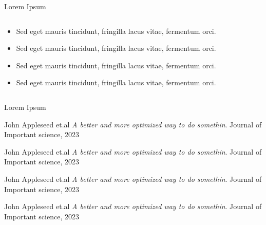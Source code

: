 \documentclass[UKenglish, aspectratio = 169]{beamer}
\begin{document}
\begin{frame}{Lorem Ipsum}
	\begin{columns}
		\begin{column}[T]{0.8\textwidth}
			\vspace*{4ex}
			\begin{itemize}
				\item Sed eget mauris tincidunt, fringilla lacus vitae, fermentum orci.
				\item Sed eget mauris tincidunt, fringilla lacus vitae, fermentum orci.
				\item Sed eget mauris tincidunt, fringilla lacus vitae, fermentum orci.
				\item Sed eget mauris tincidunt, fringilla lacus vitae, fermentum orci.
			\end{itemize}
		\end{column}
		\begin{column}{0.2\textwidth}
		\end{column}
	\end{columns}
\end{frame}

\begin{frame}[allowframebreaks]{Lorem Ipsum}

    \begin{thebibliography}{}

        John Appleseed et.al
        \newblock \emph{A better and more optimized way to do somethin}.
        \newblock  Journal of Important science, 2023
        
        John Appleseed et.al
        \newblock \emph{A better and more optimized way to do somethin}.
        \newblock  Journal of Important science, 2023
        
        John Appleseed et.al
        \newblock \emph{A better and more optimized way to do somethin}.
        \newblock  Journal of Important science, 2023
        
        John Appleseed et.al
        \newblock \emph{A better and more optimized way to do somethin}.
        \newblock  Journal of Important science, 2023

    \end{thebibliography}
\end{frame}
\end{document}
